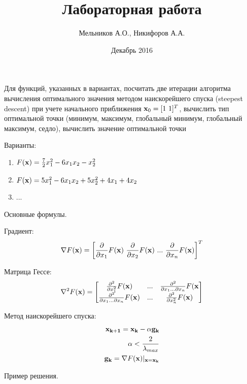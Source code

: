 \documentclass[a4paper]{report}
\begin{document}
\title{Лабораторная работа}
\author{Мельников А.О., Никифоров А.А.}
\date{Декабрь 2016}
\maketitle

Для функций, указанных в вариантах, посчитать две итерации алгоритма вычисления оптимального значения методом наискорейшего спуска (steepest descent) при
учете начального приближения ${{\bf x}_0 = [1\ 1]^T}$, вычислить тип оптимальной точки (минимум, максимум, глобальный минимум, глобальный максимум, седло),
вычислить значение оптимальной точки

Варианты:
\begin{enumerate}
    \item ${F({\bf x}) = \frac{7}{2}x_1^2 - 6 x_{1} x_{2} - x_2^2}$
    \item ${F({\bf x}) = 5x_1^2 -6x_1x_2 +5x_2^2 + 4x_1 +4x_2}$
    \item ...
\end{enumerate}

Основные формулы.

Градиент:
\begin{eqnarray}
    \nabla F({\bf x}) = \left[\frac{\partial}{\partial x_1}F({\bf x})\ \frac{\partial}{\partial x_2}F({\bf x})\ ...\ \frac{\partial}{\partial x_n}F({\bf x})\right]^T
\end{eqnarray}

Матрица Гессе:
\begin{eqnarray}
    \nabla^2 F({\bf x}) = 
    \left[
    \begin{matrix}
        \frac{\partial^2}{\partial x_1^2}F({\bf x}) & ... & \frac{\partial^2}{\partial x_1 ... \partial x_n}F({\bf x} \\
        \frac{\partial^2}{\partial x_1 ... \partial x_n}F({\bf x}) & ... & \frac{\partial^2}{\partial x_n^2}F({\bf x})
    \end{matrix}
    \right]
\end{eqnarray}

Метод наискорейшего спуска:
\begin{eqnarray}
    {\bf x_{k+1}} = {\bf x_k} - \alpha {\bf g_k} \\
    \alpha < \frac{2}{\lambda_{max}} \\
    {\bf g_k} = \nabla F({\bf x}) \vert_{\bf x=x_k}
\end{eqnarray}

Пример решения.
\end{document}
